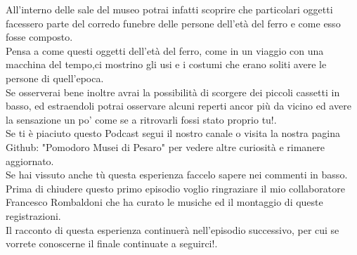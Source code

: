 \documentclass[hidelinks,12pt,a4paper]{article}
\begin{document}
\begin{flushleft}
		All'interno delle sale del museo potrai infatti scoprire che particolari oggetti facessero parte del corredo funebre delle persone dell'età del ferro e come esso fosse composto.\\
		Pensa a come questi oggetti dell'età del ferro, come in un viaggio con una macchina del tempo,ci mostrino gli usi e i costumi che erano soliti avere le persone di quell'epoca.\\
		Se osserverai bene inoltre avrai la possibilità di scorgere dei piccoli cassetti in basso, ed estraendoli potrai osservare alcuni  reperti ancor più da vicino ed avere la sensazione un po' come se a ritrovarli fossi stato proprio tu!.\\
		Se ti è piaciuto questo Podcast segui il nostro canale o visita la nostra pagina Github: "Pomodoro Musei di Pesaro" per vedere altre curiosità e rimanere aggiornato.\\
		Se hai vissuto anche tù questa esperienza faccelo sapere nei commenti in basso.\\
		Prima di chiudere questo primo episodio voglio ringraziare il mio collaboratore Francesco Rombaldoni che ha curato le musiche ed il montaggio di queste registrazioni.\\
		Il racconto di questa esperienza continuerà nell'episodio successivo, per cui se vorrete conoscerne il finale continuate a seguirci!.\\
		
		

\end{flushleft}
\end{document}

